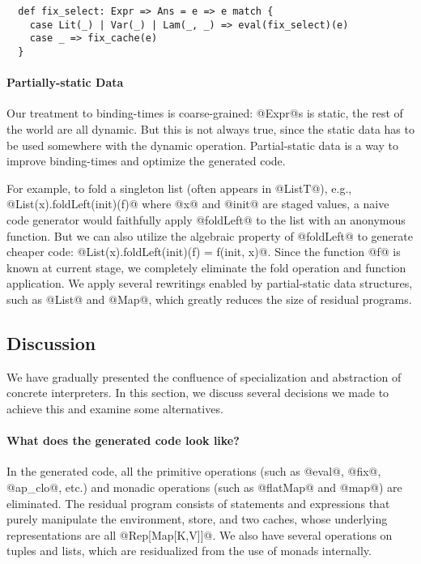 \begin{lstlisting}
  def fix_select: Expr => Ans = e => e match {
    case Lit(_) | Var(_) | Lam(_, _) => eval(fix_select)(e)
    case _ => fix_cache(e)
  }
\end{lstlisting}

\paragraph{Partially-static Data}

Our treatment to binding-times is coarse-grained: @Expr@s is static, the rest of
the world are all dynamic. But this is not always true, since the static data
has to be used somewhere with the dynamic operation. Partial-static data is a
way to improve binding-times and optimize the generated code.

For example, to fold a singleton list (often appears in @ListT@), e.g.,
@List(x).foldLeft(init)(f)@ where @x@ and @init@ are staged values, a naive code
generator would faithfully apply @foldLeft@ to the list with an anonymous
function. But we can also utilize the algebraic property of @foldLeft@ to
generate cheaper code: @List(x).foldLeft(init)(f) = f(init, x)@. Since the
function @f@ is known at current stage, we completely eliminate the fold
operation and function application. We apply several rewritings enabled by
partial-static data structures, such as @List@ and @Map@, which greatly reduces
the size of residual programs.


\subsection{Discussion}

We have gradually presented the confluence of specialization and abstraction of
concrete interpreters. In this section, we discuss several decisions we made to
achieve this and examine some alternatives.

\paragraph{What does the generated code look like?} In the generated code, all the
primitive operations (such as @eval@, @fix@, @ap_clo@, etc.) and monadic
operations (such as @flatMap@ and @map@) are eliminated. The residual program
consists of statements and expressions that purely manipulate the environment,
store, and two caches, whose underlying representations are all @Rep[Map[K,V]]@. We
also have several operations on tuples and lists, which are residualized from
the use of monads internally.

